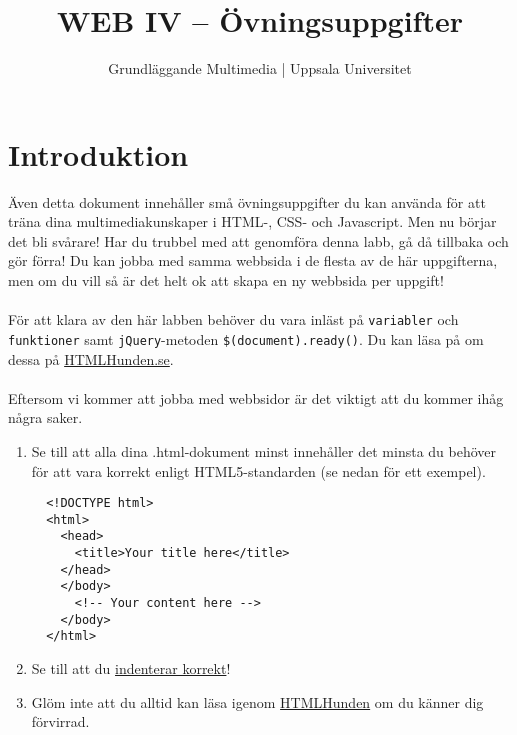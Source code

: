 \documentclass{article}
\begin{document}
  \title{ WEB IV -- Övningsuppgifter }
  \author{ Grundläggande Multimedia | Uppsala Universitet }
  \date{}
  \maketitle


  \section{ Introduktion }
    Även detta dokument innehåller små övningsuppgifter du kan använda för att träna dina multimediakunskaper i HTML-, CSS- och Javascript. Men nu börjar det bli svårare! Har du trubbel med att genomföra denna labb, gå då tillbaka och gör förra! Du kan jobba med samma webbsida i de flesta av de här uppgifterna, men om du vill så är det helt ok att skapa en ny webbsida per uppgift!
    \paragraph{}
    För att klara av den här labben behöver du vara inläst på \texttt{variabler} och \texttt{funktioner} samt \texttt{jQuery}-metoden \texttt{\$(document).ready()}. Du kan läsa på om dessa på \href{http://htmlhunden.se}{HTMLHunden.se}.

  \paragraph{}
  Eftersom vi kommer att jobba med webbsidor är det viktigt att du kommer ihåg några saker.
    \begin{enumerate}
      \item Se till att alla dina .html-dokument minst innehåller det minsta du behöver för att vara korrekt enligt HTML5-standarden (se nedan för ett exempel).
            \lstset{language=HTML}
            \begin{lstlisting}
  <!DOCTYPE html>
  <html>
    <head>
      <title>Your title here</title>
    </head>
    </body>
      <!-- Your content here -->
    </body>
  </html>
            \end{lstlisting}
      \item Se till att du \href{http://htmlhunden.se/#indentering}{indenterar korrekt}!
      \item Glöm inte att du alltid kan läsa igenom \href{http://htmlhunden.se}{HTMLHunden} om du känner dig förvirrad.
    \end{enumerate}
\end{document}

